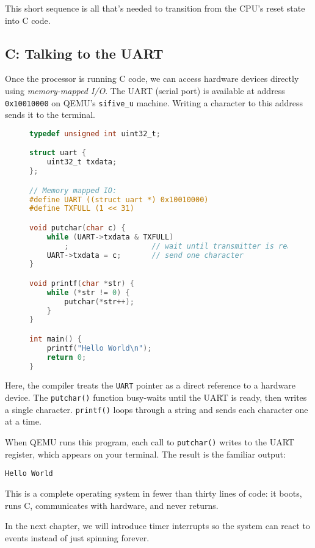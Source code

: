 This short sequence is all that’s needed to transition from the CPU’s reset
state into C code.

\subsection{C: Talking to the UART}

Once the processor is running C code, we can access hardware devices directly
using \emph{memory-mapped I/O}.  The UART (serial port) is available at address
\texttt{0x10010000} on QEMU’s \texttt{sifive\_u} machine.  Writing a character
to this address sends it to the terminal.

\begin{figure}[H]
\centering
\begin{minipage}{0.95\textwidth}
\begin{lstlisting}[style=oscode,language=C,caption={C code for printing ``Hello World'' through the UART},label={lst:hello_c}]
typedef unsigned int uint32_t;

struct uart {
    uint32_t txdata;
};

// Memory mapped IO:
#define UART ((struct uart *) 0x10010000)
#define TXFULL (1 << 31)

void putchar(char c) {
    while (UART->txdata & TXFULL)
        ;                   // wait until transmitter is ready
    UART->txdata = c;       // send one character
}

void printf(char *str) {
    while (*str != 0) {
        putchar(*str++);
    }
}

int main() {
    printf("Hello World\n");
    return 0;
}
\end{lstlisting}
\end{minipage}
\end{figure}

Here, the compiler treats the \texttt{UART} pointer as a direct reference to a
hardware device.  The \texttt{putchar()} function busy-waits until the UART is
ready, then writes a single character.  \texttt{printf()} loops through a string
and sends each character one at a time.

\medskip
\noindent
When QEMU runs this program, each call to \texttt{putchar()} writes to the UART
register, which appears on your terminal.  The result is the familiar output:

\begin{lstlisting}
Hello World
\end{lstlisting}

\medskip
\noindent
This is a complete operating system in fewer than thirty lines of code: it
boots, runs C, communicates with hardware, and never returns.

In the next chapter, we will introduce timer interrupts so the system can react
to events instead of just spinning forever.
